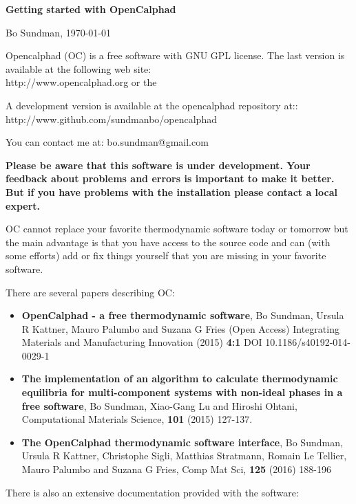 \documentclass[12pt]{article}
\begin{document}
\begin{center}
{\Large \bf Getting started with OpenCalphad}

Bo Sundman, \today

Opencalphad (OC) is a free software with GNU GPL license.  The last
version is available at the following web site:\\
http://www.opencalphad.org or the

A development version is available at the opencalphad repository at::\\
http://www.github.com/sundmanbo/opencalphad

You can contact me at: bo.sundman@gmail.com
\end{center}

{\large \bf Please be aware that this software is under development.
  Your feedback about problems and errors is important to make it
  better.  But if you have problems with the installation please
  contact a local expert.}

OC cannot replace your favorite thermodynamic software today or
tomorrow but the main advantage is that you have access to the source
code and can (with some efforts) add or fix things yourself that you
are missing in your favorite software.

There are several papers describing OC:

\begin{itemize}
\item {\bf OpenCalphad - a free thermodynamic software}, Bo Sundman,
  Ursula R Kattner, Mauro Palumbo and Suzana G Fries (Open Access)
  Integrating Materials and Manufacturing Innovation (2015) {\bf 4:1}
  DOI 10.1186/s40192-014-0029-1

\item {\bf The implementation of an algorithm to calculate
  thermodynamic equilibria for multi-component systems with non-ideal
  phases in a free software}, Bo Sundman, Xiao-Gang Lu and Hiroshi
  Ohtani, Computational Materials Science, {\bf 101} (2015) 127-137.

\item {\bf The OpenCalphad thermodynamic software interface}, Bo
  Sundman, Ursula R Kattner, Christophe Sigli, Matthias Stratmann,
  Romain Le Tellier, Mauro Palumbo and Suzana G Fries, Comp Mat Sci,
  {\bf 125} (2016) 188-196
\end{itemize}


There is also an extensive documentation provided with the software:
\end{document}

